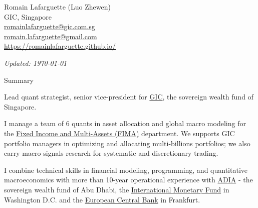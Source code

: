 \documentclass[usegeometry, 10pt, a4paper]{cv} %
\begin{document}
\hspace{10mm}
\begin{chapeau}
\begin{adresse}
\begin{flushleft}
    Romain Lafarguette (Luo Zhewen)\\
    GIC, Singapore \\
    \href{mailto:romainlafarguette@gic.com.sg}{romainlafarguette@gic.com.sg}\\
    \href{mailto:romain.lafarguette@gmail.com}{romain.lafarguette@gmail.com}\\
    \url{https://romainlafarguette.github.io/} \\
\end{flushleft}
\end{adresse}
\begin{etatcivil}
\begin{flushleft}
  \hspace{15mm} \emph{Updated: \monthyeardate\today}\\
\end{flushleft}
\end{etatcivil}
\end{chapeau}

\begin{rubriquetableau}[0.95\textwidth]{Summary}\\
  \vspace{-0.5cm}

Lead quant strategist, senior vice-president for \href{https://www.gic.com.sg/}{GIC}, the sovereign  wealth fund of
Singapore. \bigskip

I manage a team of 6 quants in asset allocation and global macro modeling for the \href{https://www.gic.com.sg/how-we-invest/investment-groups/}{Fixed Income and Multi-Assets (FIMA)} department. We supports GIC portfolio managers in optimizing and allocating multi-billions portfolios; we also carry macro signals research for systematic and discretionary trading. \bigskip

I combine technical skills in financial modeling, programming, and quantitative macroeconomics with more than 10-year operational experience with \href{https://www.adia.ae/}{ADIA} - the sovereign wealth fund of Abu Dhabi, the \href{https://www.imf.org/en/Home}{International Monetary Fund} in Washington D.C. and the \href{https://www.ecb.europa.eu/home/html/index.en.html}{European Central Bank} in Frankfurt.\\ 

\end{rubriquetableau}
\end{document}
